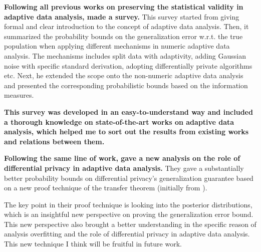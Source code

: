 \documentclass{article}
\begin{document}
\textbf{Following all previous works on preserving the statistical validity in adaptive data analysis, \cite{smith2017information} made a survey.}
This survey started from giving formal and clear introduction to the concept of adaptive data analysis.
Then, it summarized the probability bounds on the generalization error w.r.t. the true population when applying different mechanisms in numeric adaptive data analysis.
The mechanisms includes split data with adaptivity, adding Gaussian noise with specific standard derivation, adopting differentially private algorithms etc.
Next, he extended the scope onto the non-numeric adaptive data analysis and presented the corresponding probabilistic bounds based on the information measures. 

\textbf{This survey was developed in an easy-to-understand way and included a thorough knowledge on state-of-the-art works on adaptive data analysis, which helped me to sort out the results from existing works and relations between them.}


\textbf{Following the same line of work, \cite{jung2019new} gave a new analysis on the role of differential privacy in adaptive data analysis.}
They gave a substantially better probability bounds on differential privacy's generalization guarantee based on a new proof technique of the transfer theorem (initially from \cite{dwork2015generalization}). 

The key point in their proof technique is looking into the posterior distributions, which is an insightful new perspective on proving the generalization error bound. This new perspective also brought a better understanding in the specific reason of analysis overfitting and the role of differential privacy in adaptive data analysis. This new technique I think will be fruitful in future work.
\end{document}
